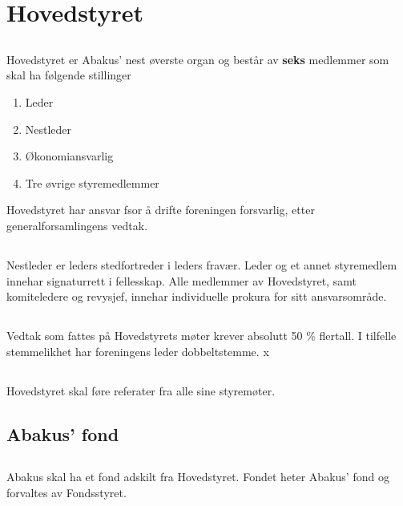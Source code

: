 \section{Hovedstyret}

\subsection{}
Hovedstyret er Abakus’ nest øverste organ og består av \textbf{seks} medlemmer som skal ha følgende stillinger 

\begin{enumerate}[label=\alph*)]
    \item Leder
    \item Nestleder
    \item Økonomiansvarlig
    \item Tre øvrige styremedlemmer
\end{enumerate}
Hovedstyret har ansvar fsor å drifte foreningen forsvarlig, etter generalforsamlingens vedtak.
\subsection{}
Nestleder er leders stedfortreder i leders fravær. Leder og et annet styremedlem innehar signaturrett i fellesskap. 
Alle medlemmer av Hovedstyret, samt komiteledere og revysjef, innehar individuelle prokura for sitt ansvarsområde. 

\subsection{}
Vedtak som fattes på Hovedstyrets møter krever absolutt 50 \% flertall. I
tilfelle stemmelikhet har foreningens leder dobbeltstemme.
x
\subsection{}
Hovedstyret skal føre referater fra alle sine styremøter. 

\subsection{Abakus’ fond}

\subsection{}
Abakus skal ha et fond adskilt fra Hovedstyret. Fondet heter Abakus’ fond og forvaltes av Fondsstyret.

